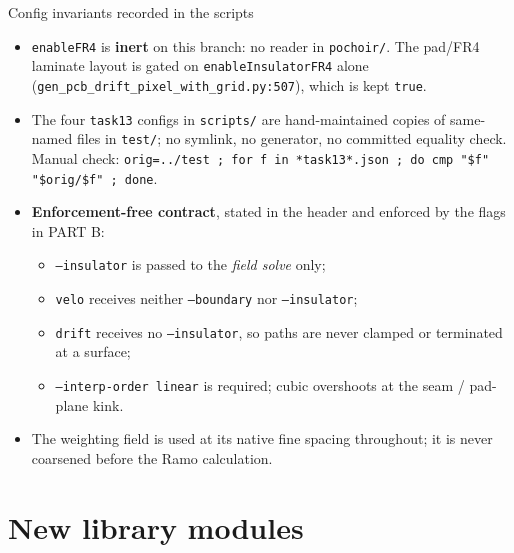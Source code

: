 \documentclass[10pt,aspectratio=169]{beamer}
\newcommand{\ti}[1]{\texttt{\footnotesize #1}}
\begin{document}
\begin{frame}[allowframebreaks]{Config invariants recorded in the scripts}
  \begin{itemize}\small
  \item \ti{enableFR4} is \textbf{inert} on this branch: no reader in \ti{pochoir/}.
        The pad/FR4 laminate layout is gated on \ti{enableInsulatorFR4} alone
        (\ti{gen\_pcb\_drift\_pixel\_with\_grid.py:507}), which is kept \ti{true}.
  \item The four \ti{task13} configs in \ti{scripts/} are hand-maintained copies of
        same-named files in \ti{test/}; no symlink, no generator, no committed equality
        check. Manual check: \ti{orig=../test ; for f in *task13*.json ; do cmp "\$f" "\$orig/\$f" ; done}.
  \item \textbf{Enforcement-free contract}, stated in the header and enforced by the
        flags in PART B:
    \begin{itemize}
    \item \ti{--insulator} is passed to the \emph{field solve} only;
    \item \ti{velo} receives neither \ti{--boundary} nor \ti{--insulator};
    \item \ti{drift} receives no \ti{--insulator}, so paths are never clamped or
          terminated at a surface;
    \item \ti{--interp-order linear} is required; cubic overshoots at the seam /
          pad-plane kink.
    \end{itemize}
  \item The weighting field is used at its native fine spacing throughout; it is never
        coarsened before the Ramo calculation.
  \end{itemize}
\end{frame}

\section{New library modules}
\end{document}
